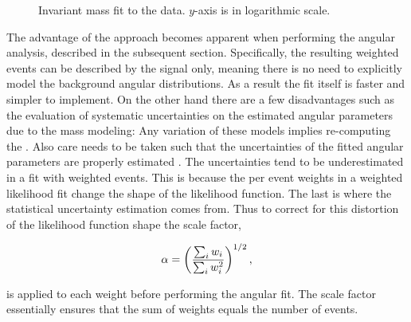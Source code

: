 \begin{figure}[t]
  \centering
  \scalebox{0.5}{}
  \caption{Invariant mass fit to the data. $y$-axis is in logarithmic scale.}
  \label{mass_plot}
\end{figure}

The advantage of the \sWeights approach becomes apparent when performing the angular analysis, described in the subsequent section.
Specifically, the resulting weighted events can be described by the signal \pdf only, meaning there is no need to explicitly model
the background angular distributions. As a result the fit itself is faster and simpler to implement. On the other hand there are a few
disadvantages such as the evaluation of systematic uncertainties on the estimated angular parameters due to the mass \pdf modeling:
Any variation of these models implies re-computing the \sWeights. Also care needs to be taken such that the uncertainties
of the fitted angular parameters are properly estimated \cite{splot}. The uncertainties tend to be underestimated in a fit with weighted
events. This is because the per event weights in a weighted likelihood fit change the shape of the likelihood function.
The last is where the statistical uncertainty estimation comes from. Thus to correct for this distortion of the likelihood
function shape the scale factor,

\begin{equation}
  \centering
  \alpha = \left(\frac{\sum_{i} w_i}{\sum_{i} w_i^2}\right)^{1/2},
  \label{sWeights_scale_factor}
\end{equation}

\noindent is applied to each weight before performing the angular fit. The scale factor essentially ensures that the sum of weights
equals the  number of events.
